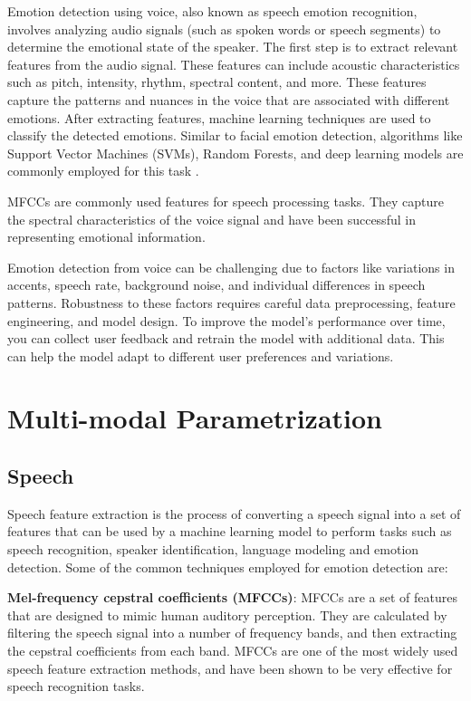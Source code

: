 \documentclass[conference]{IEEEtran}
\begin{document}
Emotion detection using voice, also known as speech emotion recognition, involves analyzing audio signals (such as spoken words or speech segments) to determine the emotional state of the speaker.  The first step is to extract relevant features from the audio signal. These features can include acoustic characteristics such as pitch, intensity, rhythm, spectral content, and more. These features capture the patterns and nuances in the voice that are associated with different emotions. After extracting features, machine learning techniques are used to classify the detected emotions. Similar to facial emotion detection, algorithms like Support Vector Machines (SVMs), Random Forests, and deep learning models are commonly employed for this task \cite{s19122730}.

MFCCs are commonly used features for speech processing tasks. They capture the spectral characteristics of the voice signal and have been successful in representing emotional information.

Emotion detection from voice can be challenging due to factors like variations in accents, speech rate, background noise, and individual differences in speech patterns. Robustness to these factors requires careful data preprocessing, feature engineering, and model design. To improve the model's performance over time, you can collect user feedback and retrain the model with additional data. This can help the model adapt to different user preferences and variations.

\section{Multi-modal Parametrization}
\subsection{Speech}
Speech feature extraction is the process of converting a speech signal into a set of features that can be used by a machine learning model to perform tasks such as speech recognition, speaker identification, language modeling  and emotion detection.  Some of the common techniques employed for emotion detection are:

\textbf{Mel-frequency cepstral coefficients (MFCCs)}: MFCCs\cite{r17} are a set of features that are designed to mimic human auditory perception. They are calculated by filtering the speech signal into a number of frequency bands, and then extracting the cepstral coefficients from each band. MFCCs are one of the most widely used speech feature extraction methods, and have been shown to be very effective for speech recognition tasks.
\end{document}
